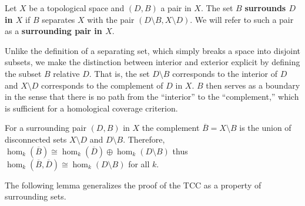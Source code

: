 
\begin{definition}
  Let $X$ be a topological space and $(D,B)$ a pair in $X$.
  The set $B$ \textbf{surrounds $D$ in $X$} if $B$ separates $X$ with the pair $(D\setminus B, X\setminus D)$.
  We will refer to such a pair as a \textbf{surrounding pair in $X$}.
\end{definition}

Unlike the definition of a separating set, which simply breaks a space into disjoint subsets, we make the distinction between interior and exterior explicit by defining the subset $B$ relative $D$.
That is, the set $D\setminus B$ corresponds to the interior of $D$ and $X\setminus D$ corresponds to the complement of $D$ in $X$.
$B$ then serves as a boundary in the sense that there is no path from the ``interior'' to the ``complement,'' which is sufficient for a homological coverage criterion.

For a surrounding pair $(D,B)$ in $X$  the complement $\overline{B} = X\setminus B$ is the union of disconnected sets $X\setminus D$ and $D\setminus B$.
Therefore, $\hom_k(\overline{B}) \cong \hom_k(\overline{D})\oplus \hom_k(D\setminus B)$ thus $\hom_k(\overline{B},\overline{D})\cong \hom_k(D\setminus B)$ for all $k$.

The following lemma generalizes the proof of the TCC as a property of surrounding sets.

